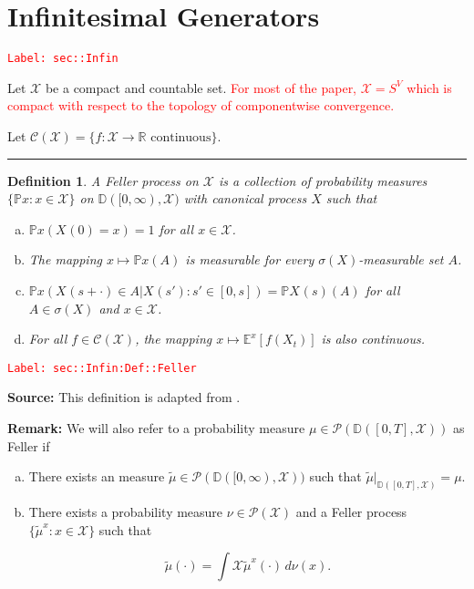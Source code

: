 \documentclass[12pt]{article}
\newcommand{\mb}{\mathbb}
\newcommand{\mc}{\mathcal}
\newcommand{\ra}{\rightarrow}
\newcommand{\te}{\text}
\newcommand{\tr}{\textcolor{red}}
\newcommand{\labe}[1]{\tr{\texttt{Label: #1}}}
\newcommand{\lin}{\rule{\linewidth}{0.4 pt}}
\newcommand{\pr}{\mb{P}}							%
\newcommand{\exmu}[2]{\mb{E}^{#1}\left[#2\right]}	%
\newcommand{\cad}{\mb{D}}							%
\renewcommand{\S}{S}							%
\newcommand{\T}{T}								%
\newcommand{\x}{x}								%
\renewcommand{\t}{t}							%
\renewcommand{\tt}{s}							%
\newcommand{\ttt}{s'}							%
\newcommand{\X}{X}								%
\newcommand{\f}{f}								%
\newcommand{\carp}[1]{^{#1}}					%
\newcommand{\cind}[1]{_{#1}}					%
\newcommand{\tp}[1]{(#1)}						%
\newcommand{\cont}{\mc{C}}						%
\newcommand{\alt}[1]{\widetilde{#1}}			%
\newcommand{\m}{\mu}							%
\newcommand{\mm}{\nu}							%
\newcommand{\typset}{A}							%
\newcommand{\spce}{\mc{X}}						%
\newtheorem{defn}[thms]{Definition}
\begin{document}
\newpage
\appendix

\section{Infinitesimal Generators}
\label{sec::Infin}\labe{sec::Infin}

Let \(\spce\) be a compact and countable set. \tr{For most of the paper, \(\spce = \S\carp{V}\) which is compact with respect to the topology of componentwise convergence.}

Let \(\cont(\spce)= \{f:\spce \ra \mb{R} \te{ continuous}\}\).

\lin

\begin{defn}
A Feller process on \(\spce\) is a collection of probability measures \(\{\pr{\x}:\x \in \spce\}\) on \(\cad([0,\infty),\spce)\) with canonical process \(\X\) such that

\begin{enumerate}[(a)]
\item \(\pr{\x}(\X\cind{}\tp{0} = \x) = 1\) for all \(\x \in \spce\).

\item The mapping \(\x \mapsto \pr{\x}(\typset)\) is measurable for every \(\sigma(\X)\)-measurable set \(\typset\).

\item \(\pr{\x}(\X\cind{}\tp{\tt+\cdot} \in \typset|\X\cind{}\tp{\ttt}:\ttt \in [0,\tt]) = \pr{\X\cind{}\tp{\tt}}(\typset)\) for all \(\typset \in \sigma(\X)\) and \(\x \in \spce\).

\item For all \(\f\in \cont(\spce)\), the mapping \(\x\mapsto \exmu{\x}{\f(\X_{\t})}\) is also continuous.
\end{enumerate}
\label{sec::Infin:Def::Feller}
\end{defn}
\labe{sec::Infin:Def::Feller}

\textbf{Source: } This definition is adapted from \cite[Definition 1.1,1.2]{Lig85}.

\textbf{Remark: } We will also refer to a probability measure \(\m \in \mc{P}(\cad([0,\T],\spce))\) as Feller if

\begin{enumerate}[(a)]
\item There exists an measure \(\alt{\m}\in \mc{P}(\cad([0,\infty),\spce))\) such that \(\alt{\m}|_{\cad([0,T],\spce)} = \m\).

\item There exists a probability measure \(\mm\in \mc{P}(\spce)\) and a Feller process \(\{\alt{\m}^\x:\x \in \spce\}\) such that 

\[\alt{\m}(\cdot) = \int{\spce} \alt{\m}^\x(\cdot)\,d\mm(\x).\]
\end{enumerate}
\end{document}
